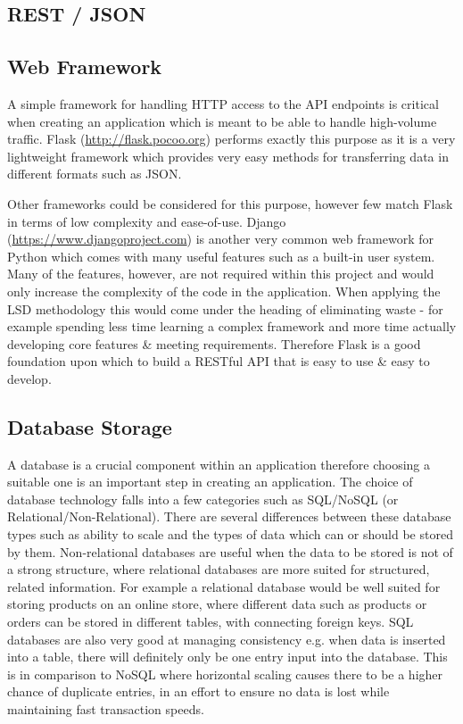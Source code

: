 \documentclass[a4paper,12pt]{report}
\begin{document}
      \subsection{REST / JSON}

      \subsection{Web Framework}
        A simple framework for handling HTTP access to the API endpoints is critical when creating an application which is meant to be able to handle high-volume traffic. Flask (\url{http://flask.pocoo.org}) performs exactly this purpose as it is a very lightweight framework which provides very easy methods for transferring data in different formats such as JSON.

        Other frameworks could be considered for this purpose, however few match Flask in terms of low complexity and ease-of-use. Django (\url{https://www.djangoproject.com}) is another very common web framework for Python which comes with many useful features such as a built-in user system. Many of the features, however, are not required within this project and would only increase the complexity of the code in the application. When applying the LSD methodology  \citep{poppendieck2003lean} this would come under the heading of eliminating waste - for example spending less time learning a complex framework and more time actually developing core features \& meeting requirements. Therefore Flask is a good foundation upon which to build a RESTful API that is easy to use \& easy to develop.

      \subsection{Database Storage} %
        A database is a crucial component within an application therefore choosing a suitable one is an important step in creating an application. The choice of database technology falls into a few categories such as SQL/NoSQL (or Relational/Non-Relational). There are several differences between these database types such as ability to scale and the types of data which can or should be stored by them. Non-relational databases are useful when the data to be stored is not of a strong structure, where relational databases are more suited for structured, related information. For example a relational database would be well suited for storing products on an online store, where different data such as products or orders can be stored in different tables, with connecting foreign keys. SQL databases are also very good at managing consistency e.g. when data is inserted into a table, there will definitely only be one entry input into the database. This is in comparison to NoSQL where horizontal scaling causes there to be a higher chance of duplicate entries, in an effort to ensure no data is lost while maintaining fast transaction speeds.
\end{document}
